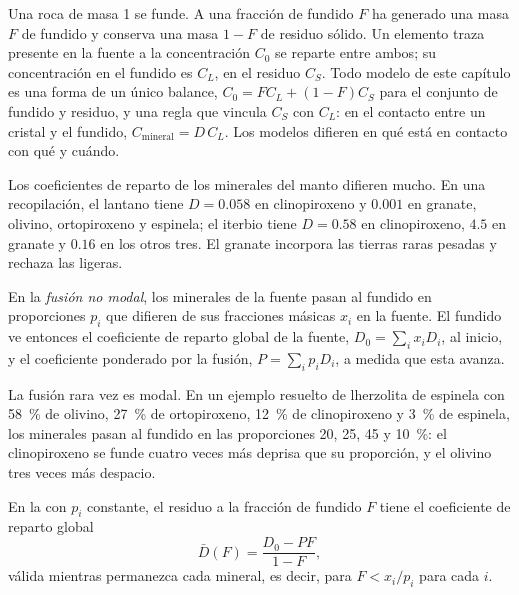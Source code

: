Una roca de masa 1 se funde. A una fracción de fundido $F$ ha generado una masa $F$ de
fundido y conserva una masa $1 - F$ de residuo sólido. Un elemento traza presente en la
fuente a la concentración $C_0$ se reparte entre ambos; su concentración
en el fundido es $C_L$, en el residuo $C_S$. Todo modelo de este capítulo es una
forma de un único balance, $C_0 = FC_L + (1 - F)C_S$ para el conjunto de fundido y residuo,
y una regla que vincula $C_S$ con $C_L$: en el contacto entre un cristal y
el fundido, $C_{\text{mineral}} = D\,C_L$. Los modelos difieren en qué está en contacto
con qué y cuándo.

Los coeficientes de reparto de los minerales del manto difieren mucho. En
una recopilación, el lantano tiene $D = 0.058$ en clinopiroxeno y $0.001$ en
granate, olivino, ortopiroxeno y espinela; el iterbio tiene $D = 0.58$ en
clinopiroxeno, $4.5$ en granate y $0.16$ en los otros tres. El granate incorpora las
tierras raras pesadas y rechaza las ligeras.

\begin{definition}\label{def:b3:trace-element-modelling:nonmodal}
En la \emph{fusión no modal}, los minerales de la
fuente pasan al fundido en proporciones $p_i$ que difieren de sus fracciones másicas
$x_i$ en la fuente. El fundido ve entonces el coeficiente de reparto global de la
fuente, $D_0 = \sum_i x_iD_i$, al inicio, y el coeficiente
ponderado por la fusión, $P = \sum_i p_iD_i$, a medida que esta avanza.
\end{definition}

La fusión rara vez es modal. En un ejemplo resuelto de lherzolita de espinela con
\qty{58}{\percent} de olivino, \qty{27}{\percent} de ortopiroxeno,
\qty{12}{\percent} de clinopiroxeno y \qty{3}{\percent} de espinela, los minerales
pasan al fundido en las proporciones 20, 25, 45 y \qty{10}{\percent}:
el clinopiroxeno se funde cuatro veces más deprisa que su proporción, y el olivino tres veces
más despacio.

\begin{proposition}
\label{prop:b3:trace-element-modelling:residue}
En la  con $p_i$ constante, el residuo a la fracción de fundido $F$
tiene el coeficiente de reparto global
\[
\bar D(F) = \frac{D_0 - PF}{1 - F},
\]
válida mientras permanezca cada mineral, es decir, para $F < x_i/p_i$ para cada $i$.
\end{proposition}

